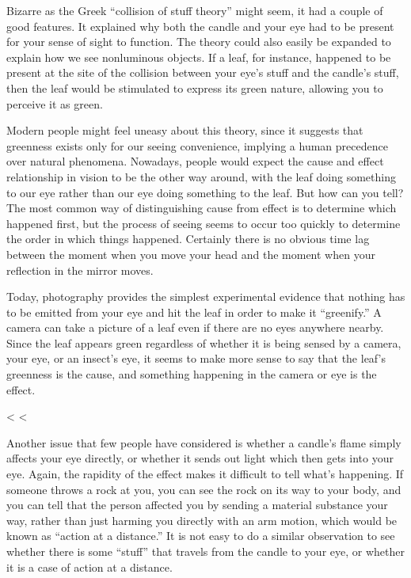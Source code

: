 Bizarre as the Greek ``collision of stuff theory'' might
seem, it had a couple of good features. It explained why
both the candle and your eye had to be present for your
sense of sight to function. The theory could also easily be
expanded to explain how we see nonluminous objects. If a
leaf, for instance, happened to be present at the site of
the collision between your eye's stuff and the candle's
stuff, then the leaf would be stimulated to express its
green nature, allowing you to perceive it as green.

Modern people might feel uneasy about this theory, since it
suggests that greenness exists only for our seeing
convenience, implying a human precedence over natural
phenomena. Nowadays, people would expect the cause and
effect relationship in vision to be the other way around,
with the leaf doing something to our eye rather than our eye
doing something to the leaf. But how can you tell? The most
common way of distinguishing cause from effect is to
determine which happened first, but the process of seeing
seems to occur too quickly to determine the order in which
things happened. Certainly there is no obvious time lag
between the moment when you move your head and the moment
when your reflection in the mirror moves.

Today, photography provides the simplest experimental
evidence that nothing has to be emitted from your eye and
hit the leaf in order to make it ``greenify.'' A camera can
take a picture of a leaf even if there are no eyes anywhere
nearby. Since the leaf appears green regardless of whether
it is being sensed by a camera, your eye, or an insect's
eye, it seems to make more sense to say that the leaf's
greenness is the cause, and something happening in the
camera or eye is the effect.

<%
<%

Another issue that few people have considered is whether a
candle's flame simply affects your eye directly, or whether
it sends out light which then gets into your eye. Again, the
rapidity of the effect makes it difficult to tell what's
happening. If someone throws a rock at you, you can see the
rock on its way to your body, and you can tell that the
person affected you by sending a material substance your
way, rather than just harming you directly with an arm
motion, which would be known as ``action at a distance.'' It
is not easy to do a similar observation to see whether there
is some ``stuff'' that travels from the candle to your eye,
or whether it is a case of action at a distance.

